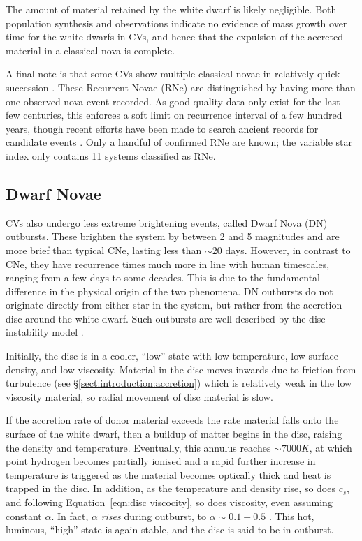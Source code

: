The amount of material retained by the white dwarf is likely negligible. Both population synthesis \citep{Wijnen2015} and observations \citep{McAllister2017} indicate no evidence of mass growth over time for the white dwarfs in CVs, and hence that the expulsion of the accreted material in a classical nova is complete.

A final note is that some CVs show multiple classical novae in relatively quick succession \citep{schaeffer2010}. These Recurrent Novae (RNe) are distinguished by having more than one observed nova event recorded. As good quality data only exist for the last few centuries, this enforces a soft limit on recurrence interval of a few hundred years, though recent efforts have been made to search ancient records for candidate events \citep{hoffmann2022}. Only a handful of confirmed RNe are known; the variable star index \citep{Watson2006} only contains 11 systems classified as RNe.

\subsection{Dwarf Novae}
\label{sect:introduction:dwarf novae}

CVs also undergo less extreme brightening events, called Dwarf Nova (DN) outbursts. These brighten the system by between 2 and 5 magnitudes \citep{warner1995} and are more brief than typical CNe, lasting less than $\sim 20$ days. However, in contrast to CNe, they have recurrence times much more in line with human timescales, ranging from a few days to some decades. This is due to the fundamental difference in the physical origin of the two phenomena.
DN outbursts do not originate directly from either star in the system, but rather from the accretion disc around the white dwarf. Such outbursts are well-described by the disc instability model \citep{cannizzo1993, dubus2018}.

Initially, the disc is in a cooler, ``low'' state with low temperature, low surface density, and low viscosity. Material in the disc moves inwards due to friction from turbulence (see \S\ref{sect:introduction:accretion}) which is relatively weak in the low viscosity material, so radial movement of disc material is slow.

If the accretion rate of donor material exceeds the rate material falls onto the surface of the white dwarf, then a buildup of matter begins in the disc, raising the density and temperature. Eventually, this annulus reaches $\sim 7000K$, at which point hydrogen becomes partially ionised and a rapid further increase in temperature is triggered as the material becomes optically thick and heat is trapped in the disc. In addition, as the temperature and density rise, so does $c_s$, and following Equation~\ref{eqn:disc viscocity}, so does viscosity, even assuming constant $\alpha$. In fact, $\alpha$ {\it rises} during outburst, to $\alpha \sim 0.1 - 0.5$ \citep{hellier2001}. This hot, luminous, ``high'' state is again stable, and the disc is said to be in outburst. 

